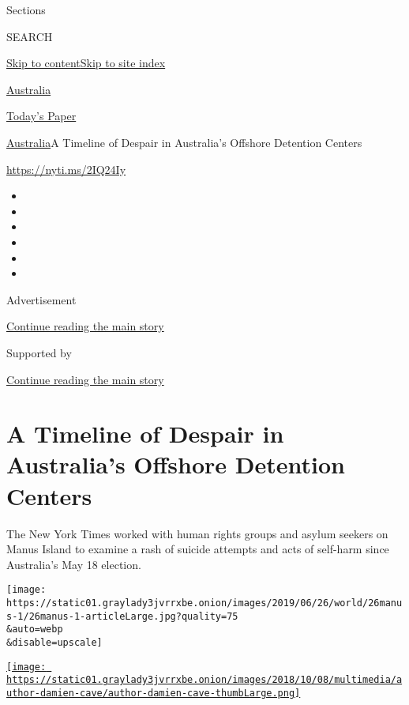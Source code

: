 Sections

SEARCH

\protect\hyperlink{site-content}{Skip to
content}\protect\hyperlink{site-index}{Skip to site index}

\href{https://www.nytimes3xbfgragh.onion/section/world/australia}{Australia}

\href{https://myaccount.nytimes3xbfgragh.onion/auth/login?response_type=cookie\&client_id=vi}{}

\href{https://www.nytimes3xbfgragh.onion/section/todayspaper}{Today's
Paper}

\href{/section/world/australia}{Australia}\textbar{}A Timeline of
Despair in Australia's Offshore Detention Centers

\url{https://nyti.ms/2IQ24Iy}

\begin{itemize}
\item
\item
\item
\item
\item
\item
\end{itemize}

Advertisement

\protect\hyperlink{after-top}{Continue reading the main story}

Supported by

\protect\hyperlink{after-sponsor}{Continue reading the main story}

\hypertarget{a-timeline-of-despair-in-australias-offshore-detention-centers}{%
\section{A Timeline of Despair in Australia's Offshore Detention
Centers}\label{a-timeline-of-despair-in-australias-offshore-detention-centers}}

The New York Times worked with human rights groups and asylum seekers on
Manus Island to examine a rash of suicide attempts and acts of self-harm
since Australia's May 18 election.

\texttt{[image: https://static01.graylady3jvrrxbe.onion/images/2019/06/26/world/26manus-1/26manus-1-articleLarge.jpg?quality=75\\\&auto=webp\\\&disable=upscale]}

\href{https://www.nytimes3xbfgragh.onion/by/damien-cave}{\texttt{[image: https://static01.graylady3jvrrxbe.onion/images/2018/10/08/multimedia/author-damien-cave/author-damien-cave-thumbLarge.png]}}

